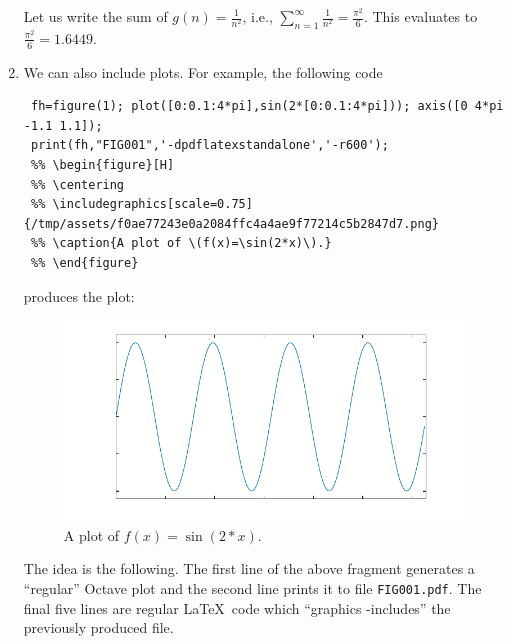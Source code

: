 \documentclass{article}
\begin{document}
\begin{enumerate}
 \qquad Let us write the sum of \(g(n)=\frac{1}{n^{2}}\), i.e., 
 \(\sum_{n=1}^\infty \frac{1}{n^{2}}  = \frac{\pi^{2}}{6}\). 
 This evaluates to \( \frac{\pi^{2}}{6} = 1.6449\).
 \item We can also include plots. For example,  the following code
 \begin{lstlisting}
 fh=figure(1); plot([0:0.1:4*pi],sin(2*[0:0.1:4*pi])); axis([0 4*pi -1.1 1.1]);
 print(fh,"FIG001",'-dpdflatexstandalone','-r600');
 %% \begin{figure}[H]
 %% \centering
 %% \includegraphics[scale=0.75]{FIG001-inc}
 %% \caption{A plot of \(f(x)=\sin(2*x)\).}
 %% \end{figure}
 \end{lstlisting}
 produces the plot:
 \begin{figure}[H]
 \centering
 \includegraphics[scale=0.75]{FIG001-inc}
 \caption{A plot of \(f(x)=\sin(2*x)\).}
 \end{figure}
 The idea is the following. The first line of the above fragment 
 generates a ``regular'' \textsf{Octave} plot and the second line prints it to file \texttt{FIG001.pdf}.
 The final five lines are regular \LaTeX\ code which ``graphics -includes'' the previously produced file.
 

\end{enumerate}
\end{document}
